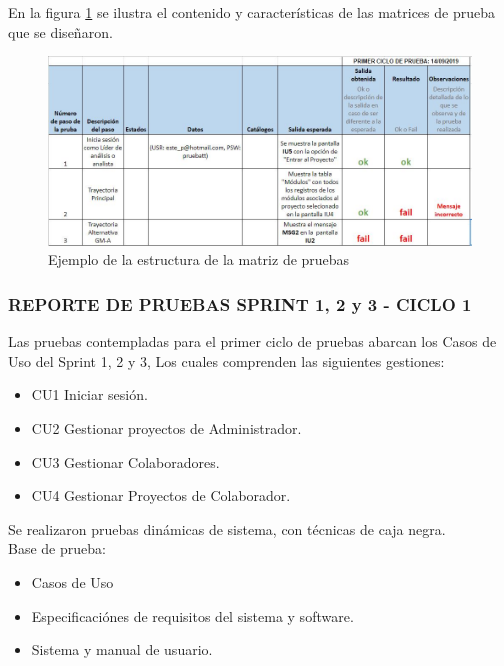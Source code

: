 En la figura \ref{fig:estructura} se ilustra el contenido y características de las matrices de prueba que se diseñaron.

\begin{figure}[H]
	\begin{center}
		\includegraphics[width=.95\textwidth]{images/pruebas/diseno/tabla}
		\caption{Ejemplo de la estructura de la matriz de pruebas}
		\label{fig:estructura}
	\end{center}
\end{figure}

\subsubsection{REPORTE DE PRUEBAS SPRINT 1, 2 y 3 - CICLO 1}

Las pruebas contempladas para el primer ciclo de pruebas abarcan los Casos de Uso del Sprint 1, 2 y 3, Los cuales comprenden las siguientes gestiones:

\begin{itemize}
	\item CU1 Iniciar sesión.
	\item CU2 Gestionar proyectos de Administrador.
	\item CU3 Gestionar Colaboradores.
	\item CU4 Gestionar Proyectos de Colaborador.
\end{itemize}

Se realizaron pruebas dinámicas de sistema, con técnicas de caja negra.\\

Base de prueba:
\begin{itemize}
	\item Casos de Uso
	\item Especificaciónes de requisitos del sistema y software.
	\item Sistema y manual de usuario.
\end{itemize}

